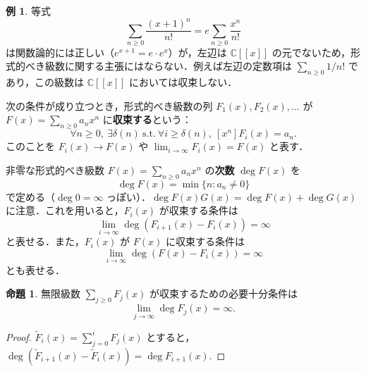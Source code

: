 \documentclass[xelatex,ja=standard,a4paper,14pt]{bxjsarticle}
\newcommand{\bbC}{\mathbb{C}}
\theoremstyle{definition}
\newtheorem{example}[theorem]{例}
\newtheorem{proposition}[theorem]{命題}
\begin{document}
\begin{example}
    等式 \begin{equation*}
        \sum_{n \geq 0} \frac{(x+1)^n}{n!} = e \sum_{n \geq 0} \frac{x^n}{n!}
    \end{equation*}
    は関数論的には正しい（$e^{x+1} = e \cdot e^x$）が，左辺は $\bbC[[x]]$ の元でないため，形式的べき級数に関する主張にはならない．例えば左辺の定数項は $\sum_{n \geq 0} 1/n!$ であり，この級数は $\bbC[[x]]$ においては収束しない．
\end{example}

次の条件が成り立つとき，形式的べき級数の列 $F_1(x), F_2(x), \ldots$ が $F(x) = \sum_{n \geq 0} a_n x^n$ に\textbf{収束する}という： \begin{equation*}
    \forall n \geq 0,\ \exists \delta(n)\ \mathrm{s.t.}\ \forall i \geq \delta(n),\ [x^n] F_i(x) = a_n.
\end{equation*}
このことを $F_i(x) \to F(x)$ や $\lim_{i \to \infty} F_i(x) = F(x)$ と表す．

非零な形式的べき級数 $F(x) = \sum_{n \geq 0} a_n x^n$ の\textbf{次数} $\deg F(x)$ を \begin{equation*}
    \deg F(x) = \min \{n : a_n \neq 0\}
\end{equation*}
で定める（$\deg 0 = \infty$ っぽい）．$\deg F(x) G(x) = \deg F(x) + \deg G(x)$ に注意．これを用いると，$F_i(x)$ が収束する条件は \begin{equation*}
    \lim_{i \to \infty} \deg(F_{i+1}(x) - F_i(x)) = \infty
\end{equation*}
と表せる．また，$F_i(x)$ が $F(x)$ に収束する条件は \begin{equation*}
    \lim_{i \to \infty} \deg(F(x) - F_i(x)) = \infty
\end{equation*}
とも表せる．

\begin{proposition}
    無限級数 $\sum_{j \geq 0} F_j(x)$ が収束するための必要十分条件は \begin{equation*}
        \lim_{j \to \infty} \deg F_j(x) = \infty.
    \end{equation*}
\end{proposition}
\begin{proof}
    $\widetilde{F}_i(x) = \sum_{j=0}^i F_j(x)$ とすると，$\deg(\widetilde{F}_{i+1}(x) - \widetilde{F}_i(x)) = \deg F_{i+1}(x)$.
\end{proof}
\end{document}
